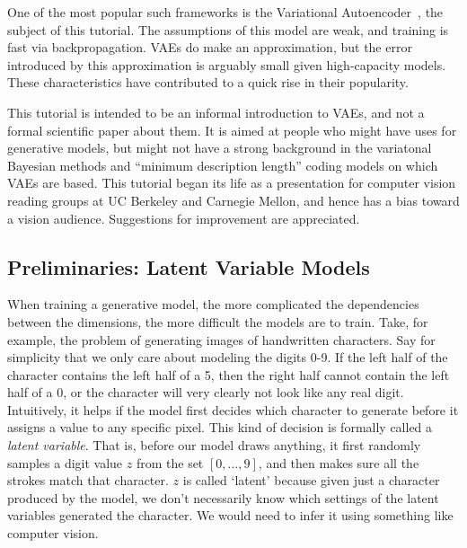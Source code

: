 \documentclass[a4paper, 11pt]{article} %
\begin{document}
One of the most popular such frameworks is the Variational Autoencoder~\cite{Kingma14a,Rezende14}, the subject of this tutorial.
The assumptions of this model are weak, and training is fast via backpropagation.
VAEs do make an approximation, but the error introduced by this approximation is arguably small given high-capacity models.
These characteristics have contributed to a quick rise in their popularity. %

This tutorial is intended to be an informal introduction to VAEs, and not a formal scientific paper about them.
It is aimed at people who might have uses for generative models, but might not have a strong background in the variatonal Bayesian methods and ``minimum description length'' coding models on which VAEs are based.
This tutorial began its life as a presentation for computer vision reading groups at UC Berkeley and Carnegie Mellon, and hence has a bias toward a vision audience.
Suggestions for improvement are appreciated.

\subsection{Preliminaries: Latent Variable Models}

When training a generative model, the more complicated the dependencies between the dimensions, the more difficult the models are to train.  
Take, for example, the problem of generating images of handwritten characters.  
Say for simplicity that we only care about modeling the digits 0-9.  
If the left half of the character contains the left half of a 5, then the right half cannot contain the left half of a 0, or the character will very clearly not look like any real digit.  
Intuitively, it helps if the model first decides which character to generate before it assigns a value to any specific pixel.
This kind of decision is formally called a \textit{latent variable}.
That is, before our model draws anything, it first randomly samples a digit value $z$ from the set $[0,...,9]$, and then makes sure all the strokes match that character.  
$z$ is called `latent' because given just a character produced by the model, we don't necessarily know which settings of the latent variables generated the character.
We would need to infer it using something like computer vision.
\end{document}
